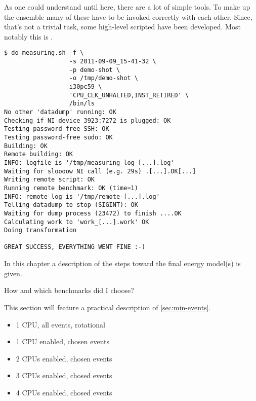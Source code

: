 As one could understand until here, there are a lot of simple tools. To make up
the ensemble many of these have to be invoked correctly with each other. Since,
that's not a trivial task, some high-level scripted have been developed. Most
notably this is \JWTdomeasuring{}.

\begin{lstlisting}[style=Shell]
$ do_measuring.sh -f \
                  -s 2011-09-09_15-41-32 \
                  -p demo-shot \
                  -o /tmp/demo-shot \
                  i30pc59 \
                  'CPU_CLK_UNHALTED,INST_RETIRED' \
                  /bin/ls
No other 'datadump' running: OK
Checking if NI device 3923:7272 is plugged: OK
Testing password-free SSH: OK
Testing password-free sudo: OK
Building: OK
Remote building: OK
INFO: logfile is '/tmp/measuring_log_[...].log'
Waiting for sloooow NI call (e.g. 29s) .[...].OK[...]
Writing remote script: OK
Running remote benchmark: OK (time=1)
INFO: remote log is '/tmp/remote-[...].log'
Telling datadump to stop (SIGINT): OK
Waiting for dump process (23472) to finish ....OK
Calculating work to 'work_[...].work' OK
Doing transformation

GREAT SUCCESS, EVERYTHING WENT FINE :-)
\end{lstlisting}


\label{sec:towards-the-model}

In this chapter a description of the steps toward the final energy model(s) is
given.


\label{sec:benchmarks}

How and which benchmarks did I choose?


\label{sec:finding-useful-subset}

This section will feature a practical description of
\ref{sec:min-events}.

\begin{itemize}

\item 1 CPU, all events, rotational

\item 1 CPU enabled, chosen events

\item 2 CPUs enabled, chosen events

\item 3 CPUs enabled, chosed events

\item 4 CPUs enabled, chosed events

\end{itemize}


